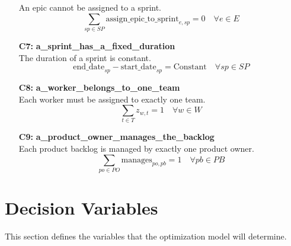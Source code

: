 \documentclass[11pt, a4paper]{article}
\begin{document}
\begin{itemize}
    An epic cannot be assigned to a sprint.
    $$ \sum_{sp \in SP} \text{assign\_epic\_to\_sprint}_{e, sp} = 0 \quad \forall e \in E $$
    \item[\textbf{C7:}] \textbf{a\_sprint\_has\_a\_fixed\_duration} \\
    The duration of a sprint is constant.
    $$ \text{end\_date}_{sp} - \text{start\_date}_{sp} = \text{Constant} \quad \forall sp \in SP $$
    \item[\textbf{C8:}] \textbf{a\_worker\_belongs\_to\_one\_team} \\
    Each worker must be assigned to exactly one team.
    $$ \sum_{t \in T} z_{w, t} = 1 \quad \forall w \in W $$
    \item[\textbf{C9:}] \textbf{a\_product\_owner\_manages\_the\_backlog} \\
    Each product backlog is managed by exactly one product owner.
    $$ \sum_{po \in PO} \text{manages}_{po, pb} = 1 \quad \forall pb \in PB $$
\end{itemize}

\section{Decision Variables}
This section defines the variables that the optimization model will determine.
\end{document}
